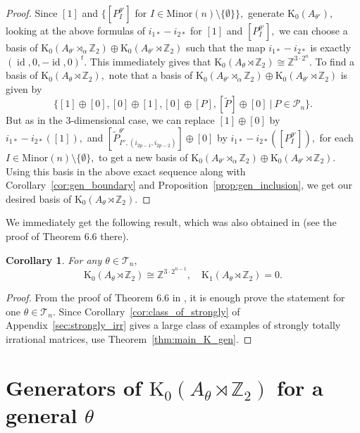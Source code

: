 \documentclass[9pt, BCOR=2mm]{amsart}
\numberwithin{equation}{section}
\numberwithin{equation}{section}
\newtheorem{corollary}[theorem]{Corollary}
\newcommand{\Z}{{\mathbb{Z}}}
\newcommand{\K}{\mathrm{K}} %
\DeclareMathOperator{\id}{id}
\begin{document}
\begin{proof}
  Since $[1]$ and $\{[P_{I}^{\theta'}]$ for  $I\in \mathrm{Minor}(n)\setminus \{\emptyset\}\},$ generate $\K_0(A_{\theta'}),$ 
 looking at the above formulas of $i_{1*}-i_{2*}$ for $[1]$ and $[P_{I}^{\theta'}],$ we can choose a basis of $\K_0 (A_{\theta'}\rtimes_\alpha  \Z_2)\oplus \K_0 (A_{\theta'}\rtimes \Z_2)$ such that the map $i_{1*}-i_{2*}$ is exactly  $(\id, 0,-\id, 0)^t.$ This immediately gives that $\K_0(A_{\theta}\rtimes \Z_2)\cong \Z^{3\cdot 2^{n}}.$  
To find a basis of $\K_0(A_{\theta}\rtimes \Z_2),$ note that a basis of $\K_0 (A_{\theta'}\rtimes_\alpha  \Z_2)\oplus \K_0 (A_{\theta'}\rtimes\Z_2)$ is given by  $$\{[1]\oplus [0], [0]\oplus [1], [0]\oplus [P],[\tilde P]\oplus [0] ~|~ P\in \mathcal{P}_n\}.$$ But as in the 3-dimensional case, we can replace $[1]\oplus [0]$ by $i_{1*}-i_{2*}([1]),$ and $[\tilde P_{I'', (i_{2p-1},i_{2p-2})} ^{\theta'}]\oplus [0]$ by  $i_{1*}-i_{2*}([P_{I}^{\theta'}]),$ for each $I\in \mathrm{Minor}(n)\setminus \{\emptyset\},$ to get a new basis of $\K_0 (A_{\theta'}\rtimes_\alpha  \Z_2)\oplus \K_0 (A_{\theta'}\rtimes \Z_2).$ Using this basis in the above exact sequence along with Corollary~\ref{cor:gen_boundary} and Proposition~\ref{prop:gen_inclusion}, we get our desired basis of 
 $\K_0(A_{\theta}\rtimes \Z_2).$ 
 \end{proof}
  
  We immediately get the following result, which was also obtained in \cite{ELPW10} (see the proof of Theorem 6.6 there).   
  
  \begin{corollary}\label{thm:main_kthoeryall} For any $\theta \in \mathcal{T}_n,$ 
	$$
\K_{0}(A_{\theta}\rtimes \Z_2) \cong \mathbb{Z}^{3 \cdot 2^{n-1}}, \quad \K_{1}(A_{\theta}\rtimes \Z_2) = 0 .
$$
 \end{corollary} 
\begin{proof} 

	From the proof of Theorem 6.6 in \cite{ELPW10}, it is enough  prove the statement for one  $\theta \in \mathcal{T}_n.$ Since Corollary~\ref{cor:class_of_strongly} of Appendix~\ref{sec:strongly_irr} gives a large class of examples of strongly totally irrational matrices, use Theorem~\ref{thm:main_K_gen}.
\end{proof}


 
  \section{Generators of  $\K_0(A_\theta\rtimes \Z_2)$ for a general $\theta$}\label{sec:gen_general}
\end{document}
